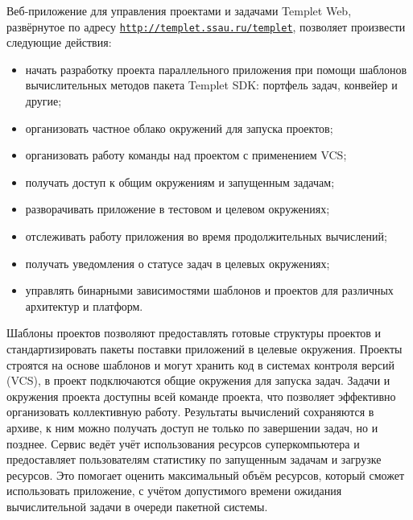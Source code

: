 Веб-приложение для управления проектами и задачами Templet Web, развёрнутое по адресу \href{http://templet.ssau.ru/templet}{\tt http://templet.ssau.ru/templet}, позволяет произвести следующие действия:

\begin{itemize}

\item начать разработку проекта параллельного приложения при помощи шаблонов вычислительных методов пакета Templet SDK: портфель задач, конвейер и другие;

\item организовать частное облако окружений для запуска проектов;

\item организовать работу команды над проектом с применением VCS;

\item получать доступ к общим окружениям и запущенным задачам;

\item разворачивать приложение в тестовом и целевом окружениях;

\item отслеживать работу приложения во время продолжительных вычислений;

\item получать уведомления о статусе задач в целевых окружениях;

\item управлять бинарными зависимостями шаблонов и проектов для различных архитектур и платформ.

\end{itemize}



Шаблоны проектов позволяют предоставлять готовые структуры проектов и стандартизировать пакеты поставки приложений в целевые окружения. Проекты строятся на основе шаблонов и могут хранить код в системах контроля версий (VCS), в проект подключаются общие окружения для запуска задач. Задачи и окружения проекта доступны всей команде проекта, что позволяет эффективно организовать коллективную работу. Результаты вычислений сохраняются в архиве, к ним можно получать доступ не только по завершении задач, но и позднее. Сервис ведёт учёт использования ресурсов суперкомпьютера и предоставляет пользователям статистику по запущенным задачам и загрузке ресурсов. Это помогает оценить максимальный объём ресурсов, который сможет использовать приложение, с учётом допустимого времени ожидания вычислительной задачи в очереди пакетной системы.



